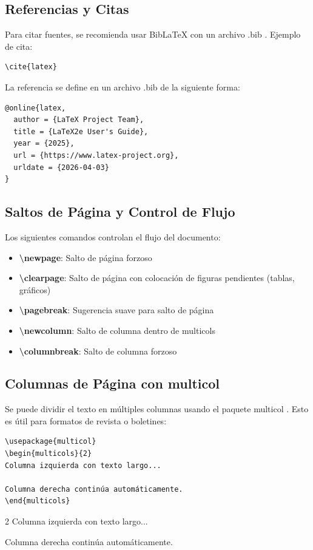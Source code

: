 \subsection{Referencias y Citas}

Para citar fuentes, se recomienda usar BibLaTeX con un archivo .bib \cite{biblatex}. Ejemplo de cita:

\begin{verbatim}
\cite{latex}
\end{verbatim}

La referencia se define en un archivo .bib de la siguiente forma:

\begin{verbatim}
@online{latex,
  author = {LaTeX Project Team},
  title = {LaTeX2e User's Guide},
  year = {2025},
  url = {https://www.latex-project.org},
  urldate = {2026-04-03}
}
\end{verbatim}

\subsection{Saltos de Página y Control de Flujo}

Los siguientes comandos controlan el flujo del documento:

\begin{itemize}
    \item \textbf{\textbackslash newpage}: Salto de página forzoso
    \item \textbf{\textbackslash clearpage}: Salto de página con colocación de figuras pendientes (tablas, gráficos)
    \item \textbf{\textbackslash pagebreak}: Sugerencia suave para salto de página
    \item \textbf{\textbackslash newcolumn}: Salto de columna dentro de multicols
    \item \textbf{\textbackslash columnbreak}: Salto de columna forzoso
\end{itemize}

\subsection{Columnas de Página con multicol}

Se puede dividir el texto en múltiples columnas usando el paquete multicol \cite{multicol}. Esto es útil para formatos de revista o boletines:

\begin{verbatim}
\usepackage{multicol}
\begin{multicols}{2}
Columna izquierda con texto largo...

Columna derecha continúa automáticamente.
\end{multicols}
\end{verbatim}

\begin{tcolorbox}[title=Salida,colback=white!10,colframe=black,fonttitle=\bfseries]
\begin{multicols}{2}
Columna izquierda con texto largo...

Columna derecha continúa automáticamente.
\end{multicols}
\end{tcolorbox}